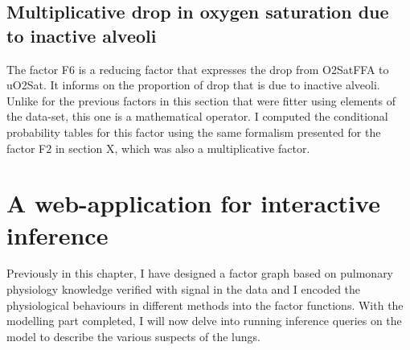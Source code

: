\subsection{Multiplicative drop in oxygen saturation due to inactive alveoli}
The factor F6 is a reducing factor that expresses the drop from O2SatFFA to uO2Sat. It informs on the proportion of drop that is due to inactive alveoli. Unlike for the previous factors in this section that were fitter using elements of the \BR data-set, this one is a mathematical operator. I computed the conditional probability tables for this factor using the same formalism presented for the factor F2 in section X, which was also a multiplicative factor.









\section{A web-application for interactive inference}
Previously in this chapter, I have designed a factor graph based on pulmonary physiology knowledge verified with signal in the data and I encoded the physiological behaviours in different methods into the factor functions. With the modelling part completed, I will now delve into running inference queries on the model to describe the various suspects of the lungs.


